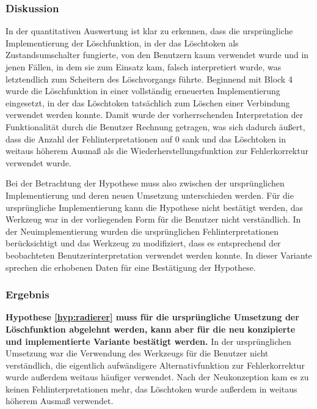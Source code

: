 \subsubsection{Diskussion} %

In der quantitativen Auswertung ist klar zu erkennen, dass die ursprüngliche Implementierung der Löschfunktion, in der das Löschtoken als Zustandsumschalter fungierte, von den Benutzern kaum verwendet wurde und in jenen Fällen, in dem sie zum Einsatz kam, falsch interpretiert wurde, was letztendlich zum Scheitern des Löschvorgangs führte. Beginnend mit Block 4 wurde die Löschfunktion in einer vollständig erneuerten Implementierung eingesetzt, in der das Löschtoken tatsächlich zum Löschen einer Verbindung verwendet werden konnte. Damit wurde der vorherrschenden Interpretation der Funktionalität durch die Benutzer Rechnung getragen, was sich dadurch äußert, dass die Anzahl der Fehlinterpretationen auf 0 sank und das Löschtoken in weitaus höherem Ausmaß als die Wiederherstellungsfunktion zur Fehlerkorrektur verwendet wurde.

Bei der Betrachtung der Hypothese muss also zwischen der ursprünglichen Implementierung und deren neuen Umsetzung unterschieden werden. Für die ursprüngliche Implementierung kann die Hypothese nicht bestätigt werden, das Werkzeug war in der vorliegenden Form für die Benutzer nicht verständlich. In der Neuimplementierung wurden die ursprünglichen Fehlinterpretationen berücksichtigt und das Werkzeug zu modifiziert, dass es entsprechend der beobachteten Benutzerinterpretation verwendet werden konnte. In dieser Variante sprechen die erhobenen Daten für eine Bestätigung der Hypothese.

\subsubsection{Ergebnis} %

\textbf{Hypothese \ref{hyp:radierer} muss für die ursprüngliche Umsetzung der Löschfunktion abgelehnt werden, kann aber für die neu konzipierte und implementierte Variante bestätigt werden.} In der ursprünglichen Umsetzung war die Verwendung des Werkzeugs für die Benutzer nicht verständlich, die eigentlich aufwändigere Alternativfunktion zur Fehlerkorrektur wurde außerdem weitaus häufiger verwendet. Nach der Neukonzeption kam es zu keinen Fehlinterpretationen mehr, das Löschtoken wurde außerdem in weitaus höherem Ausmaß verwendet.


